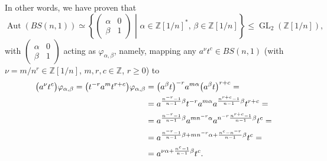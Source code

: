 \documentclass[english]{amsart}
\theoremstyle{definition}
\newcommand\ZZ{\mathbb{Z}}
\newcommand{\GL}{\operatorname{GL}}
\newcommand{\Aut}{\operatorname{Aut}}
\begin{document}
In other words, we have proven that
%
\begin{equation}\label{eq: aut semi direct}
\Aut(BS(n,1))\simeq \left\{\left( \left.\begin{array}{cc} \alpha & 0 \\ \beta & 1 \end{array} \right) \,\, \right| \,\, \alpha\in \ZZ[1/n]^*,\, \beta\in \ZZ[1/n]\right\}\leqslant \GL_2(\ZZ[1/n]),
\end{equation}
%
with $\left( \begin{smallmatrix} \alpha & 0 \\ \beta & 1 \end{smallmatrix} \right)$ acting as $\varphi_{\alpha, \beta}$, namely, mapping any $a^{\nu}t^c\in BS(n,1)$ (with $\nu=m/n^r\in \ZZ[1/n]$, $m,r,c\in \ZZ$, $r\geq 0$) to 
 \begin{align}\label{eq: action}
\big( a^{\nu}t^c \big) \varphi_{\alpha,\beta} = \big( t^{-r}a^{m}t^{r+c}\big) \varphi_{\alpha, \beta} &= \big( a^{\beta}t\big)^{-r} a^{m\alpha} \big(a^{\beta}t\big)^{r+c}= \notag \\ &= a^{\frac{n^{-r}-1}{n-1}\beta}t^{-r} a^{m\alpha} a^{\frac{n^{r+c}-1}{n-1}\beta}t^{r+c}= \notag \\ &= a^{\frac{n^{-r}-1}{n-1}\beta} a^{m n^{-r}\alpha} a^{n^{-r}\frac{n^{r+c}-1}{n-1}\beta}t^{c}= \\ &= a^{\frac{n^{-r}-1}{n-1}\beta+ m n^{-r}\alpha + \frac{n^{c}-n^{-r}}{n-1}\beta}t^{c}= \notag \\ &= a^{\nu \alpha + \frac{n^{c}-1}{n-1}\beta}t^{c}. \notag
 \end{align}
\end{document}
